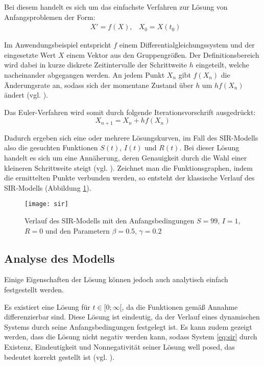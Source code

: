 \documentclass[../main.tex]{subfiles}
\begin{document}
    Bei diesem handelt es sich um das einfachste Verfahren zur Lösung von Anfangsproblemen der Form:
    \begin{equation*}
        \begin{aligned}
            &X' = f(X), &X_0 = X(t_0)
        \end{aligned}
    \end{equation*}

    Im Anwendungsbeispiel entspricht $f$ einem Differentialgleichungssystem und der eingesetzte Wert $X$ einem Vektor aus den Gruppengrößen.
    Der Definitionsbereich wird dabei in kurze diskrete Zeitintervalle der Schrittweite $h$ eingeteilt, welche nacheinander abgegangen werden. An jedem Punkt $X_n$ gibt $f(X_n)$ die Änderungsrate an, sodass sich der momentane Zustand über $h$ um $hf(X_n)$ ändert (vgl. \cite[S. 53]{Heu13}).
    
    Das Euler-Verfahren wird somit durch folgende Iterationsvorschrift ausgedrückt:
    \begin{equation*}
        X_{n+1} = X_n + h f(X_n)
    \end{equation*}

    Dadurch ergeben sich eine oder mehrere Lösungskurven, im Fall des SIR-Modells also die gesuchten Funktionen $S(t)$, $I(t)$ und $R(t)$. Bei dieser Lösung handelt es sich um eine Annäherung, deren Genauigkeit durch die Wahl einer kleineren Schrittweite steigt (vgl. \cite[S. 55]{Heu13}). 
    Zeichnet man die Funktionsgraphen, indem die ermittelten Punkte verbunden werden, so entsteht der klassische Verlauf des SIR-Modells (Abbildung \ref{fig:sir}).

    \begin{figure}[h]
        \texttt{[image: sir]}
        \caption[Verlauf des SIR-Modells]{Verlauf des SIR-Modells mit den Anfangsbedingungen $S=99$, $I=1$, $R=0$ und den Parametern $\beta=0.5$, $\gamma=0.2$}
        \label{fig:sir}
    \end{figure}

    \subsection{Analyse des Modells}
    \label{ssec:analysis1}
    Einige Eigenschaften der Lösung können jedoch auch analytisch einfach festgestellt werden.

    Es existiert eine Lösung für $t \in [0; \infty[$, da die Funktionen gemäß Annahme differenzierbar sind. Diese Lösung ist eindeutig, da der Verlauf eines dynamischen Systems durch seine Anfangsbedingungen festgelegt ist.
    Es kann zudem gezeigt werden, dass die Lösung nicht negativ werden kann, sodass System \eqref{eq:sir} durch Existenz, Eindeutigkeit und Nonnegativität seiner Lösung \glqq well posed\grqq, das bedeutet korrekt gestellt ist (vgl. \cite[S. 37f]{Li18}).
\end{document}

